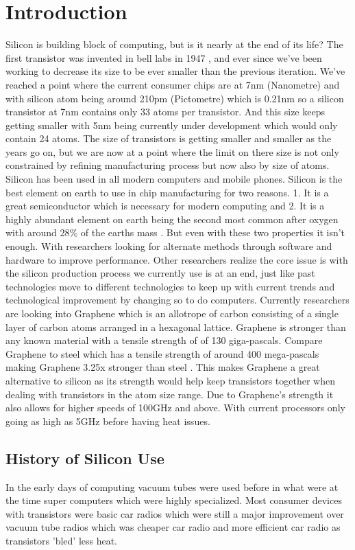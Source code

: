 \documentclass[journal]{IEEEtran}
\begin{document}
\section{Introduction}
Silicon is building block of computing, but is it nearly at the end of its life? The first transistor was invented in bell labs in 1947 \cite{8896076320180101}, and ever since we've been working to decrease its size to be ever smaller than the previous iteration. We've reached a point where the current consumer chips are at 7nm (Nanometre) and with silicon atom \cite{8947487520180101} being around 210pm (Pictometre) which is 0.21nm so a silicon transistor at 7nm contains only 33 atoms per transistor. And this size keeps getting smaller with 5nm being currently under development which would only contain 24 atoms. The size of transistors is getting smaller and smaller as the years go on, but we are now at a point where the limit on there size is not only constrained by refining manufacturing process but now also by size of atoms. Silicon has been used in all modern computers and mobile phones. Silicon is the best element on earth to use in chip manufacturing for two reasons. 1. It is a great semiconductor which is necessary for modern computing and 2. It is a highly abundant element on earth being the second most common after oxygen with around 28\% of the earths mass \cite{8947487520180101}. But even with these two properties it isn't enough. With researchers looking for alternate methods through software and hardware to improve performance. Other researchers realize the core issue is with the silicon production process we currently use is at an end, just like past technologies move to different technologies to keep up with current trends and technological improvement by changing so to do computers. Currently researchers are looking into Graphene \cite{nicol_2018} which is an allotrope of carbon consisting of a single layer of carbon atoms arranged in a hexagonal lattice. Graphene is stronger than any known material with a tensile strength of  of 130 giga-pascals. Compare Graphene to steel which has a tensile strength of around 400 mega-pascals making Graphene 3.25x stronger than steel \cite{dume_2008}. This makes Graphene a great alternative to silicon as its strength would help keep transistors together when dealing with transistors in the atom size range. Due to Graphene's strength it also allows for higher speeds of 100GHz \cite{johnson_2010} and above. With current processors only going as high as 5GHz before having heat issues.

\subsection{History of Silicon Use}
In the early days of computing vacuum tubes \cite{8931727020180101} were used before in what were at the time super computers which were highly specialized. Most consumer devices with transistors were basic car radios which were still a major improvement over vacuum tube radios which was cheaper car radio and more efficient car radio as transistors 'bled' less heat.
\end{document}
